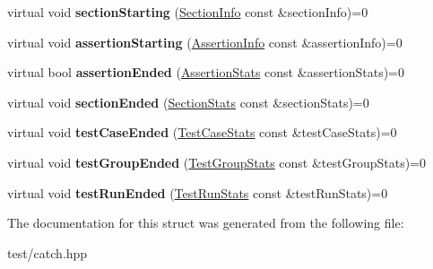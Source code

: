 \begin{DoxyCompactItemize}
\item 
virtual void {\bfseries section\+Starting} (\hyperlink{structCatch_1_1SectionInfo}{Section\+Info} const \&section\+Info)=0\hypertarget{structCatch_1_1IStreamingReporter_aa6236178937a43c2d7665729fcb79521}{}\label{structCatch_1_1IStreamingReporter_aa6236178937a43c2d7665729fcb79521}

\item 
virtual void {\bfseries assertion\+Starting} (\hyperlink{structCatch_1_1AssertionInfo}{Assertion\+Info} const \&assertion\+Info)=0\hypertarget{structCatch_1_1IStreamingReporter_ae1c3becff20f4a940c9f01d2c4114a17}{}\label{structCatch_1_1IStreamingReporter_ae1c3becff20f4a940c9f01d2c4114a17}

\item 
virtual bool {\bfseries assertion\+Ended} (\hyperlink{structCatch_1_1AssertionStats}{Assertion\+Stats} const \&assertion\+Stats)=0\hypertarget{structCatch_1_1IStreamingReporter_a5248ab87149e0f1abe2de96c387ff5e3}{}\label{structCatch_1_1IStreamingReporter_a5248ab87149e0f1abe2de96c387ff5e3}

\item 
virtual void {\bfseries section\+Ended} (\hyperlink{structCatch_1_1SectionStats}{Section\+Stats} const \&section\+Stats)=0\hypertarget{structCatch_1_1IStreamingReporter_aba7a6ce1f315da47b8017b5ca6d1d008}{}\label{structCatch_1_1IStreamingReporter_aba7a6ce1f315da47b8017b5ca6d1d008}

\item 
virtual void {\bfseries test\+Case\+Ended} (\hyperlink{structCatch_1_1TestCaseStats}{Test\+Case\+Stats} const \&test\+Case\+Stats)=0\hypertarget{structCatch_1_1IStreamingReporter_ae295b98b77bab527be53ea9d35dfe66f}{}\label{structCatch_1_1IStreamingReporter_ae295b98b77bab527be53ea9d35dfe66f}

\item 
virtual void {\bfseries test\+Group\+Ended} (\hyperlink{structCatch_1_1TestGroupStats}{Test\+Group\+Stats} const \&test\+Group\+Stats)=0\hypertarget{structCatch_1_1IStreamingReporter_abf668bf347eda4ba94fa2b3483ca4dd3}{}\label{structCatch_1_1IStreamingReporter_abf668bf347eda4ba94fa2b3483ca4dd3}

\item 
virtual void {\bfseries test\+Run\+Ended} (\hyperlink{structCatch_1_1TestRunStats}{Test\+Run\+Stats} const \&test\+Run\+Stats)=0\hypertarget{structCatch_1_1IStreamingReporter_a1ac383df84242bc55578e32ebca13e88}{}\label{structCatch_1_1IStreamingReporter_a1ac383df84242bc55578e32ebca13e88}

\end{DoxyCompactItemize}


The documentation for this struct was generated from the following file\+:\begin{DoxyCompactItemize}
\item 
test/catch.\+hpp\end{DoxyCompactItemize}

